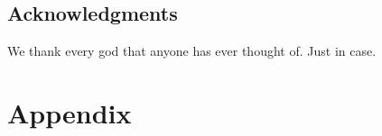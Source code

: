 \documentclass[12pt]{article}
\begin{document}
\subsection*{Acknowledgments}

We thank every god that anyone has ever thought of. Just in case.

\printbibliography

\clearpage

\section{Appendix}


\end{document}
